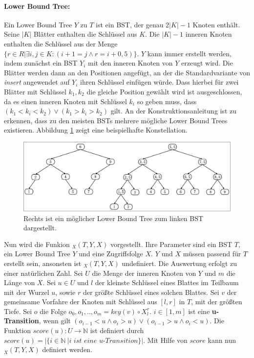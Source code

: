 \documentclass[a4paper,12pt]{article}
\begin{document}
\paragraph{Lower Bound Tree:} \label{wilberLowerBoundTree}
Ein Lower Bound Tree $Y$ zu $T$ ist ein BST, der genau $2 \vert K\vert  - 1$ Knoten enthält. Seine $\vert K \vert$ Blätter enthalten die Schlüssel aus $K$. Die $\vert K \vert - 1$ inneren Knoten enthalten die Schlüssel aus der Menge $\{r \in R \vert \exists i,j \in K \colon \left( i + 1 = j \land r = i + 0,5\right)\}$. $Y$ kann immer erstellt werden, indem zunächst ein BST $Y_i$ mit den inneren Knoten von $Y$ erzeugt wird. Die Blätter werden dann an den Positionen angefügt, an der die Standardvariante von \textit{insert} angewendet auf $Y_i$ ihren Schlüssel einfügen würde. Dass hierbei für zwei Blätter mit Schlüssel $k_1, k_2$ die gleiche Position gewählt wird ist ausgeschlossen, da es einen inneren Knoten mit Schlüssel $k_i$ so geben muss, dass $\left(k_1 < k_i < k_2\right) \lor \left(k_1 > k_i > k_2 \right)$ gilt. An der Konstruktionsanleitung ist zu erkennen, dass zu den meisten BSTs mehrere mögliche Lower Bound Trees existieren. Abbildung \ref{fig:lowerBoundTree} zeigt eine beispielhafte Konstellation. \\



\begin{figure}[H]
	\centering
	\includegraphics[width=1\textwidth]{Medien/DynOpt/lowerBoundTree}
	\caption{Rechts ist ein möglicher Lower Bound Tree zum linken BST dargestellt.  }
	\label{fig:lowerBoundTree}
\end{figure}

\noindent Nun wird die Funkion $_X(T, Y, X) $ vorgestellt. Ihre Parameter sind ein BST $T$, ein Lower Bound Tree $Y$ und eine Zugriffsfolge $X$. $Y$ und $X$ müssen passend für $T$ erstellt sein, ansonsten ist $_X(T, Y, X) $ undefiniert. Die Auswertung erfolgt zu einer natürlichen Zahl. Sei $U$ die Menge der inneren Knoten von $Y$ und $m$ die Länge von $X$. Sei $u \in U$ und $l$ der kleinste Schlüssel eines Blattes im Teilbaum mit der Wurzel $u$, sowie $r$ der größte Schlüssel eines solchen Blattes. Sei $v$ der gemeinsame Vorfahre der Knoten mit Schlüssel aus $\left[l, r\right]$  in $T$, mit der größten Tiefe. Sei $o$ die Folge $o_0, o_1,..,o_m =  \mathit{key}(v) \circ X^r_l$. $i \in \left[1,m\right]$ ist eine  \mbox{\textbf{u-Transition}}, wenn gilt $\left( o_{i-1} < u \land o_i > u \right) \lor \left( o_{i-1} > u \land o_i < u \right)$. Die Funktion $\mathit{score}\left(u\right) \colon U \rightarrow \mathbb{N}$ ist definiert durch $\mathit{score}\left(u\right) = \vert\{i \in \mathbb{N}\ \vert \textit{i ist eine u-Transition}\} \vert$. Mit Hilfe von $\mathit{score}$ kann nun  $_X(T, Y, X) $ definiert werden.
\end{document}
